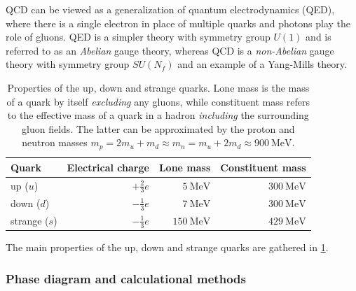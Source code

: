 QCD can be viewed as a generalization of quantum electrodynamics (QED),
where there is a single electron in place of multiple quarks and photons play the role of gluons.
QED is a simpler theory with symmetry group $U(1)$ and is referred to as an \emph{Abelian} gauge theory,
whereas QCD is a \emph{non-Abelian} gauge theory with symmetry group $SU(N_f)$ and an example of a Yang-Mills theory.

\begin{table}[b]
\centering
{ \renewcommand{\arraystretch}{1.2} %
\begin{tabular}{ l r r r }
	\toprule
	Quark & Electrical charge & Lone mass & Constituent mass \\
	\midrule
	up ($u$) & $+\frac23 e$ & $\SI{5}{\mega\electronvolt}$ & $\SI{300}{\mega\electronvolt}$ \\
	down ($d$) & $-\frac13 e$ & $\SI{7}{\mega\electronvolt}$ & $\SI{300}{\mega\electronvolt}$ \\
	strange ($s$) & $-\frac13 e$ & $\SI{150}{\mega\electronvolt}$ & $\SI{429}{\mega\electronvolt}$ \\
	\bottomrule
\end{tabular} }
\caption{\label{tab:qcd:quark_properties}%
	Properties of the up, down and strange quarks.
	Lone mass is the mass of a quark by itself \emph{excluding} any gluons,
	while constituent mass refers to the effective mass of a quark in a hadron \emph{including} the surrounding gluon fields.
	The latter can be approximated by the proton and neutron masses $m_p = 2 m_u + m_d \approx m_n = m_u + 2 m_d \approx \SI{900}{\mega\electronvolt}$.
}
\end{table}

The main properties of the up, down and strange quarks are gathered in \cref{tab:qcd:quark_properties}.

\subsubsection{Phase diagram and calculational methods}

